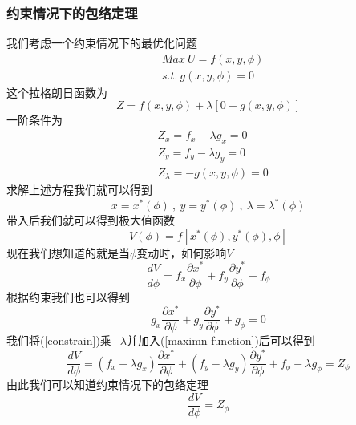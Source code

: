 \documentclass[UTF8,12pt]{ctexart}
\numberwithin{equation}{section} %
\numberwithin{figure}{section}
\numberwithin{table}{section}
\begin{document}
	\subsubsection{约束情况下的包络定理}
	我们考虑一个约束情况下的最优化问题
	\begin{equation}
		\begin{aligned}
			&Max \ U = f(x,y,\phi) \\
			&s.t. \ g(x,y,\phi) = 0
		\end{aligned}
	\end{equation}
	这个拉格朗日函数为
	\begin{equation}
		Z = f(x,y,\phi) + \lambda[0 - g(x,y,\phi)]
	\end{equation}
	一阶条件为
	\begin{equation}
		\begin{aligned}
			&Z_x = f_x - \lambda g_x = 0 \\
			&Z_y = f_y - \lambda g_y = 0 \\
			&Z_{\lambda} = -g(x,y,\phi) = 0
		\end{aligned}
	\end{equation}
	求解上述方程我们就可以得到
	\begin{equation}
		x = x^*(\phi) \ , \ y = y^*(\phi) \ , \ \lambda = \lambda^*(\phi)
	\end{equation}
	带入后我们就可以得到极大值函数
	\begin{equation}
		V(\phi) = f[x^*(\phi),y^*(\phi),\phi]
	\end{equation}
	现在我们想知道的就是当$\phi$变动时，如何影响$V$
	\begin{equation}
		\frac{dV}{d\phi} = f_x\frac{\partial x^*}{\partial \phi} + f_y\frac{\partial y^*}{\partial \phi} + f_{\phi}
		\label{maximn function}
	\end{equation}
	根据约束我们也可以得到
	\begin{equation}
		g_x\frac{\partial x^*}{\partial \phi} + g_y\frac{\partial y^*}{\partial \phi} + g_{\phi} = 0
		\label{constrain}
	\end{equation}
	我们将(\ref{constrain})乘$-\lambda$并加入(\ref{maximn function})后可以得到
	\begin{equation}
		\frac{dV}{d\phi} = (f_x - \lambda g_x)\frac{\partial x^*}{\partial \phi} + (f_y - \lambda g_y)\frac{\partial y^*}{\partial \phi} + f_{\phi} - \lambda g_{\phi} = Z_{\phi}
	\end{equation}
	由此我们可以知道约束情况下的包络定理
	\begin{equation}
		\frac{dV}{d\phi} = Z_{\phi}
	\end{equation}
	
\end{document}
